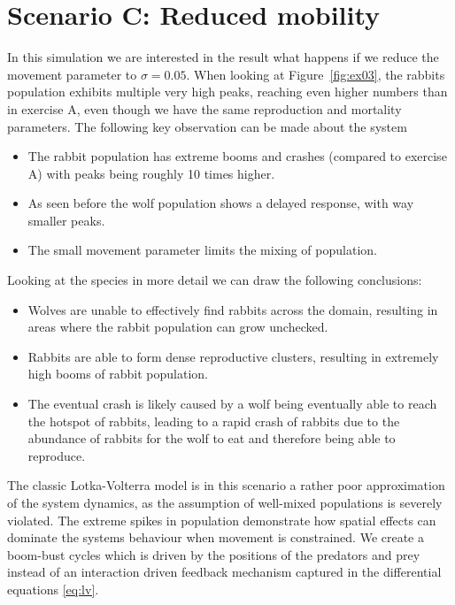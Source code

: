 \section*{Scenario C: Reduced mobility}
In this simulation we are interested in the result what happens if we reduce the movement parameter to $\sigma = 0.05$.
When looking at Figure~\ref{fig:ex03}, the rabbits population exhibits multiple very high peaks, reaching even higher numbers than in exercise A, even though we have the same reproduction and mortality parameters.
The following key observation can be made about the system
\begin{itemize}
	\item The rabbit population has extreme booms and crashes (compared to exercise A) with peaks being roughly 10 times higher.
	\item As seen before the wolf population shows a delayed response, with way smaller peaks.
	\item The small movement parameter limits the mixing of population.
\end{itemize}
Looking at the species in more detail we can draw the following conclusions:
\begin{itemize}
	\item Wolves are unable to effectively find rabbits across the domain, resulting in areas where the rabbit population can grow unchecked.
	\item Rabbits are able to form dense reproductive clusters, resulting in extremely high booms of rabbit population.
	\item The eventual crash is likely caused by a wolf being eventually able to reach the hotspot of rabbits, leading to a rapid crash of rabbits due to the abundance of rabbits for the wolf to eat and therefore being able to reproduce.
\end{itemize}
The classic Lotka-Volterra model is in this scenario a rather poor approximation of the system dynamics, as the assumption of well-mixed populations is severely violated. The extreme spikes in population demonstrate how spatial effects can dominate the systems behaviour when movement is constrained. We create a boom-bust cycles which is driven by the positions of the predators and prey instead of an interaction driven feedback mechanism captured in the differential equations \eqref{eq:lv}.
